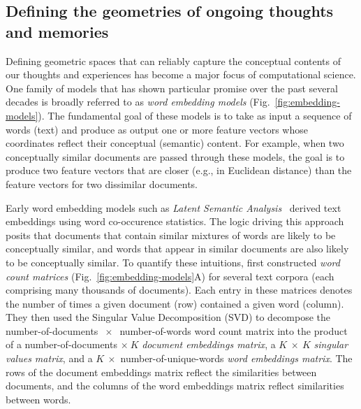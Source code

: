 \documentclass{article}
\begin{document}
\subsection*{Defining the geometries of ongoing thoughts and memories}
Defining geometric spaces that can reliably capture the conceptual contents of our thoughts and experiences has become a major focus of computational science.  One family of models that has shown particular promise over the past several decades is broadly referred to as \textit{word embedding models} (Fig.~\ref{fig:embedding-models}).  The fundamental goal of these models is to take as input a sequence of words (text) and produce as output one or more feature vectors whose coordinates reflect their conceptual (semantic) content.  For example, when two conceptually similar documents are passed through these models, the goal is to produce two feature vectors that are closer (e.g., in Euclidean distance) than the feature vectors for two dissimilar documents.

Early word embedding models such as \textit{Latent Semantic Analysis}~\citep[LSA;][]{DeerEtal90, LandDuma97} derived text embeddings using word co-occurence statistics.  The logic driving this approach posits that documents that contain similar mixtures of words are likely to be conceptually similar, and words that appear in similar documents are also likely to be conceptually similar.  To quantify these intuitions, \cite{DeerEtal90} first constructed \textit{word count matrices} (Fig.~\ref{fig:embedding-models}A) for several text corpora (each comprising many thousands of documents).  Each entry in these matrices denotes the number of times a given document (row) contained a given word (column).  They then used the Singular Value Decomposition (SVD) to decompose the number-of-documents $~\times~$ number-of-words word count matrix into the product of a number-of-documents $\times~K$ \textit{document embeddings matrix}, a $K~\times~K$ \textit{singular values matrix}, and a $K~\times$ number-of-unique-words \textit{word embeddings matrix}.  The rows of the document embeddings matrix reflect the similarities between documents, and the columns of the word embeddings matrix reflect similarities between words.
\end{document}
